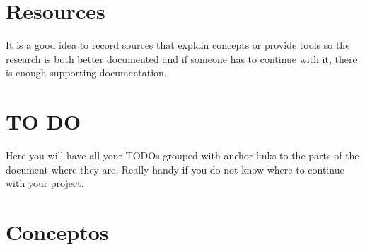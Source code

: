 \documentclass[11pt,letterpaper]{article}
\begin{document}
\section{Resources}
\begin{tip}
It is a good idea to record sources that explain concepts or provide tools so the research is both better documented and if someone has to continue with it, there is enough supporting documentation.
\end{tip}
%
%
%
%
%
%        
%
%
%
\clearpage
\section{TO DO}
\begin{tip}
Here you will have all your TODOs grouped with anchor links to the parts of the document where they are. Really handy if you do not know where to continue with your project.
\end{tip}
\listoftodos

\newpage

\section{Conceptos}
\end{document}
